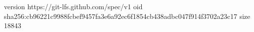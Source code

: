 version https://git-lfs.github.com/spec/v1
oid sha256:cb96221c9988fcbef9457fa3e6a92ec6f1854cb438adbc047f914f3702a23c17
size 18843

